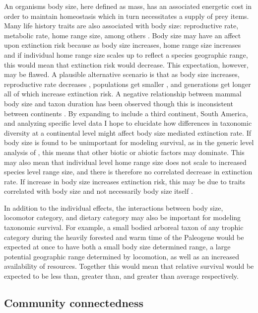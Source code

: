 \documentclass[11pt,letterpaper]{article}
\begin{document}
An organisms body size, here defined as mass, has an associated energetic cost in order to maintain homeostasis which in turn necessitates a supply of prey items. Many life history traits are also associated with body size: reproductive rate, metabolic rate, home range size, among others \cite{Peters1983a,Damuth1979,Brown1987,Smith2004}. Body size may have an affect upon extinction risk because as body size increases, home range size increases \citep{Damuth1979} and if individual home range size scales up to reflect a species geographic range, this would mean that extinction risk would decrease. This expectation, however, may be flawed. A plausible alternative scenario is that as body size increases, reproductive rate decreases \citep{Johnson2002b}, populations get smaller \citep{White2007}, and generations get longer \citep{Martin1993a} all of which increase extinction risk. A negative relationship between mammal body size and taxon duration has been observed \citep{Liow2008,Davidson2012} though this is inconsistent between continents \citep{Tomiya2013,Liow2008}. By expanding to include a third continent, South America, and analyzing specific level data I hope to elucidate how differences in taxonomic diversity at a continental level might affect body size mediated extinction rate. If body size is found to be unimportant for modeling survival, as in the generic level analysis of \citet{Tomiya2013}, this means that other biotic or abiotic factors may dominate. This may also mean that individual level home range size does not scale to increased species level range size, and there is therefore no correlated decrease in extinction rate. If increase in body size increases extinction risk, this may be due to traits correlated with body size and not necessarily body size itself \citep{Johnson2002b}.

In addition to the individual effects, the interactions between body size, locomotor category, and dietary category may also be important for modeling taxonomic survival. For example, a small bodied arboreal taxon of any trophic category during the heavily forested and warm time of the Paleogene would be expected at once to have both a small body size determined range, a large potential geographic range determined by locomotion, as well as an increased availability of resources. Together this would mean that relative survival would be expected to be less than, greater than, and greater than average respectively. 

\subsection{Community connectedness}
\end{document}
